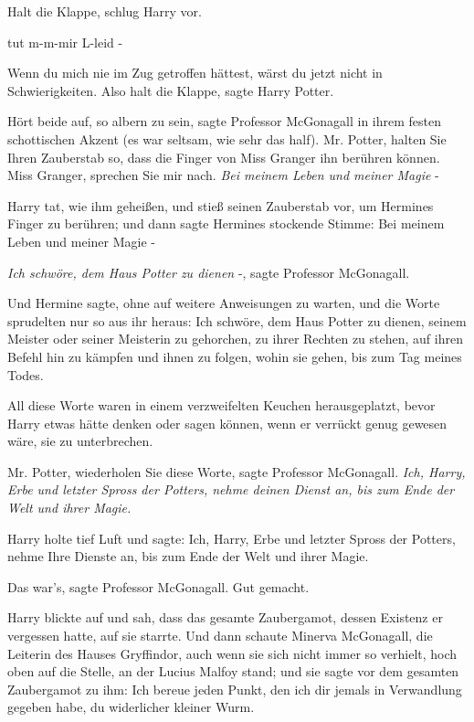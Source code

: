 \glqq Halt die Klappe\grqq{}, schlug Harry vor.

\glqq tut m-m-mir L-leid -\grqq{}

\glqq Wenn du mich nie im Zug getroffen hättest, wärst du jetzt nicht in
Schwierigkeiten. Also halt die Klappe\grqq{}, sagte Harry Potter.

\glqq Hört beide auf, so albern zu sein\grqq{}, sagte Professor McGonagall in
ihrem festen schottischen Akzent (es war seltsam, wie sehr das half). \glqq Mr.
Potter, halten Sie Ihren Zauberstab so, dass die Finger von Miss Granger ihn
berühren können. Miss Granger, sprechen Sie mir nach. \emph{Bei meinem Leben und
meiner Magie }-\grqq{}

Harry tat, wie ihm geheißen, und stieß seinen Zauberstab vor, um Hermines Finger
zu berühren; und dann sagte Hermines stockende Stimme: \glqq Bei meinem Leben
und meiner Magie -\grqq{}

\glqq \emph{Ich schwöre, dem Haus Potter zu dienen} -\grqq{}, sagte Professor
McGonagall.

Und Hermine sagte, ohne auf weitere Anweisungen zu warten, und die Worte
sprudelten nur so aus ihr heraus: \glqq Ich schwöre, dem Haus Potter zu dienen,
seinem Meister oder seiner Meisterin zu gehorchen, zu ihrer Rechten zu stehen,
auf ihren Befehl hin zu kämpfen und ihnen zu folgen, wohin sie gehen, bis zum
Tag meines Todes.\grqq{}

All diese Worte waren in einem verzweifelten Keuchen herausgeplatzt, bevor Harry
etwas hätte denken oder sagen können, wenn er verrückt genug gewesen wäre, sie
zu unterbrechen.

\glqq Mr. Potter, wiederholen Sie diese Worte\grqq{}, sagte Professor
McGonagall. \glqq \emph{Ich, Harry, Erbe und letzter Spross der Potters, nehme
deinen Dienst an, bis zum Ende der Welt und ihrer Magie.}\grqq{}

Harry holte tief Luft und sagte: \glqq Ich, Harry, Erbe und letzter Spross der
Potters, nehme Ihre Dienste an, bis zum Ende der Welt und ihrer Magie.\grqq{}

\glqq Das war's\grqq{}, sagte Professor McGonagall. \glqq Gut gemacht.\grqq{}

Harry blickte auf und sah, dass das gesamte Zaubergamot, dessen Existenz er
vergessen hatte, auf sie starrte. Und dann schaute Minerva McGonagall, die
Leiterin des Hauses Gryffindor, auch wenn sie sich nicht immer so verhielt, hoch
oben auf die Stelle, an der Lucius Malfoy stand; und sie sagte vor dem gesamten
Zaubergamot zu ihm: \glqq Ich bereue jeden Punkt, den ich dir jemals in
Verwandlung gegeben habe, du widerlicher kleiner Wurm.\grqq{}

